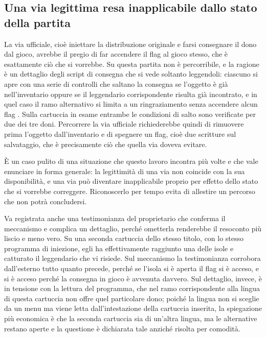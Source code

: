 \subsection{Una via legittima resa inapplicabile dallo stato della partita}

La via ufficiale, cioè iniettare la distribuzione originale e farsi consegnare il dono dal gioco, avrebbe il pregio di far accendere il flag al gioco stesso, che è esattamente ciò che si vorrebbe. Su questa partita non è percorribile, e la ragione è un dettaglio degli script di consegna che si vede soltanto leggendoli: ciascuno si apre con una serie di controlli che saltano la consegna se l'oggetto è già nell'inventario oppure se il leggendario corrispondente risulta già incontrato, e in quel caso il ramo alternativo si limita a un ringraziamento senza accendere alcun flag \cite{pokeemerald}. Sulla cartuccia in esame entrambe le condizioni di salto sono verificate per due dei tre doni. Percorrere la via ufficiale richiederebbe quindi di rimuovere prima l'oggetto dall'inventario e di spegnere un flag, cioè due scritture sul salvataggio, che è precisamente ciò che quella via doveva evitare.

È un caso pulito di una situazione che questo lavoro incontra più volte e che vale enunciare in forma generale: la legittimità di una via non coincide con la sua disponibilità, e una via può diventare inapplicabile proprio per effetto dello stato che si vorrebbe correggere. Riconoscerlo per tempo evita di allestire un percorso che non potrà concludersi.

Va registrata anche una testimonianza del proprietario che conferma il meccanismo e complica un dettaglio, perché ometterla renderebbe il resoconto più liscio e meno vero. Su una seconda cartuccia dello stesso titolo, con lo stesso programma di iniezione, egli ha effettivamente raggiunto una delle isole e catturato il leggendario che vi risiede. Sul meccanismo la testimonianza corrobora dall'esterno tutto quanto precede, perché se l'isola si è aperta il flag si è acceso, e si è acceso perché la consegna in gioco è avvenuta davvero. Sul dettaglio, invece, è in tensione con la lettura del programma, che nel ramo corrispondente alla lingua di questa cartuccia non offre quel particolare dono; poiché la lingua non si sceglie da un menu ma viene letta dall'intestazione della cartuccia inserita, la spiegazione più economica è che la seconda cartuccia sia di un'altra lingua, ma le alternative restano aperte e la questione è dichiarata tale anziché risolta per comodità.

